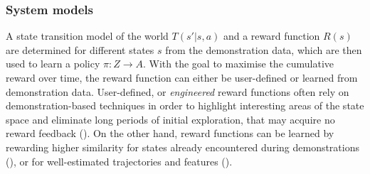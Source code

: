 \subsubsection{System models}
A state transition model of the world $T(s'|s, a)$ and a reward function $R(s)$ are determined for different states $s$ from the demonstration data, which are then used to learn a policy $\pi : Z \rightarrow A$. With the goal to maximise the cumulative reward over time, the reward function can either be user-defined or learned from demonstration data.
User-defined, or \textit{engineered} reward functions often rely on demonstration-based techniques in order to highlight interesting areas of the state space and eliminate long periods of initial exploration, that may acquire no reward feedback (\cite{smart2002effective}).
On the other hand, reward functions can be learned by rewarding higher similarity for states already encountered during demonstrations (\cite{atkeson1997robot}), or for well-estimated trajectories and features (\cite{abbeel2004apprenticeship}).
